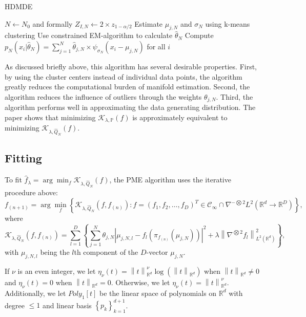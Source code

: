 \begin{algorithm}
  \caption{HDMDE}
  \label{alg:two}
  $N \leftarrow N_0$ and formally $Z_{I, N} \leftarrow 2 \times z_{1-\alpha / 2}$\;
  Estimate $\mu_{j, N}$ and $\sigma_N$ using k-means clustering\;
  Use constrained EM-algorithm to calculate $\hat{\theta}_N$\;
  Compute $p_N(x_i | \hat{\theta}_N) = \sum_{j=1}^{N}\hat{\theta}_{j, N} \times \psi_{\sigma_N}(x_i - \mu_{j, N})$ for all $i$\;
\end{algorithm}

As discussed briefly above, this algorithm has several desirable properties. First, by using the cluster centers instead of individual data points, the algorithm greatly reduces the computational burden of manifold estimation. Second, the algorithm reduces the influence of outliers through the weights $\theta_{j, N}$. Third, the algorithm performs well in approximating the data generating distribution. The paper shows that minimizing $\mathcal{K}_{\lambda, \mathbb{P}}(f)$ is approximately equivalent to minimizing $\mathcal{K}_{\lambda, \hat{Q}_N}(f)$.

\subsection*{Fitting}

To fit $\hat{f}_{\lambda} = \arg \min_f \mathcal{K}_{\lambda, \hat{Q}_N}(f)$, the PME algorithm uses the iterative procedure above:
\[%
  f_{(n + 1)} = \arg \min_f\left\{\mathcal{K}_{\lambda, \hat{Q}_N}(f, f_{(n)}): f = (f_1, f_2, \dots, f_D)^{T} \in \mathcal{C}_{\infty} \cap \nabla^{-\bigotimes 2}L^2(\mathbb{R}^{d} \to \mathbb{R}^{D})\right\}
,\]%
where 
\[%
  \mathcal{K}_{\lambda, \hat{Q}_N}(f, f_{(n)}) = \sum_{l=1}^{D}\left\{\sum_{j=1}^{N}\theta_{j, N}\left|\mu_{j, N, l} - f_{l}\left(\pi_{f_{(n)}}(\mu_{j, N})\right)\right|^2 + \lambda \left\|\nabla^{\bigotimes 2}f_l\right\|_{L^2(\mathbb{R}^{d})}^2\right\}
,\]%
with $\mu_{j, N, l}$ being the $l$th component of the $D$-vector $\mu_{j, N}$. 

If $\nu$ is an even integer, we let $\eta_{\nu}(t) = \left\|t\right\|_{\mathbb{R}^{d}}^{\nu}\log\left(\left\|t\right\|_{\mathbb{R}^{d}}\right)$ when $\left\|t\right\|_{\mathbb{R}^{d}} \neq 0$ and $\eta_{\nu}(t) = 0$ when $\left\|t\right\|_{\mathbb{R}^{d}} = 0$. Otherwise, we let $\eta_{\nu}(t) = \left\|t\right\|_{\mathbb{R}^{d}}^{\nu}$. Additionally, we let $Poly_1[t]$ be the linear space of polynomials on $\mathbb{R}^{d}$ with degree $\leq 1$ and linear basis $\left\{p_k\right\}_{k=1}^{d+1}$.

